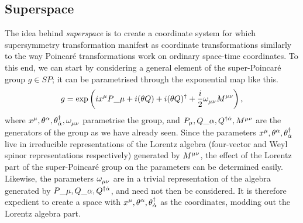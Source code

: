 \documentclass[../main.tex]{subfiles}
\begin{document}
\subsection{Superspace}
The idea behind \emph{superspace} is to create a coordinate system for which supersymmetry transformation manifest as coordinate transformations similarly to the way Poincaré transformations work on ordinary space-time coordinates.
To this end, we can start by considering a general element of the super-Poincaré group \(g \in SP\); it can be parametrised through the exponential map like this.
\begin{equation}
  g = \exptext{ix\^{\mu} P\_{\mu} + i(\theta Q) + i (\theta Q)^\dagger + \frac{i}{2}\tensor{\omega}{_\mu_\nu}\tensor{M}{^\mu^\nu}},
\end{equation}
where \(x^\mu, \theta\^{\alpha}, \theta\indices*{^\dagger_{\dot\alpha}}, \tensor{\omega}{_\mu_\nu}\) parametrise the group, and \(P_\mu, Q\_{\alpha}, Q\indices*{^\dagger^{\dot\alpha}}, \tensor{M}{^\mu^\nu}\) are the generators of the group as we have already seen.
Since the parameters \(x\^{\mu}, \theta\^{\alpha}, \theta\indices*{^\dagger_{\dot\alpha}}\) live in irreducible representations of the Lorentz algebra (four-vector and Weyl spinor representations respectively) generated by \(\tensor{M}{^\mu^\nu}\), the effect of the Lorentz part of the super-Poincaré group on the parameters can be determined easily.
Likewise, the parameters \(\tensor{\omega}{_\mu_\nu}\) are in a trivial representation of the algebra generated by \(P\_{\mu}, Q\_{\alpha}, Q\indices*{^\dagger^{\dot\alpha}}\), and need not then be considered.
It is therefore expedient to create a space with \(x\^{\mu}, \theta\^{\alpha}, \theta\indices*{^\dagger_{\dot\alpha}}\) as the coordinates, modding out the Lorentz algebra part.
\end{document}
